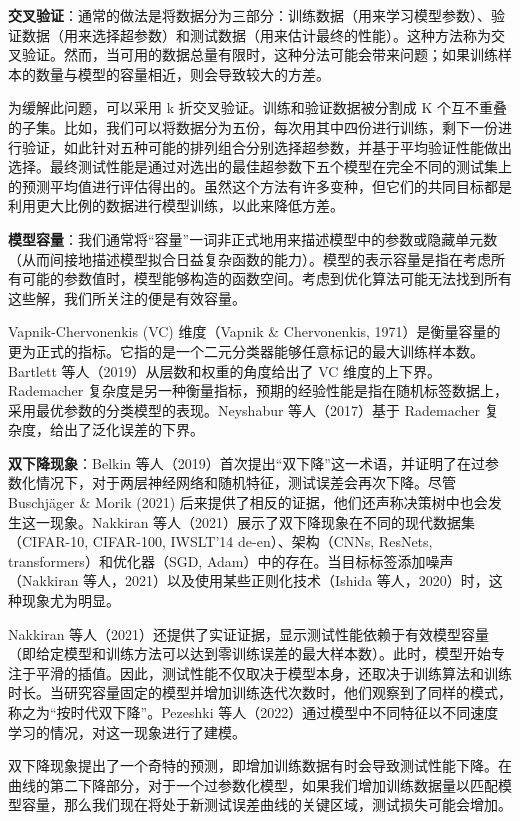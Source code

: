 \documentclass[lang=cn,newtx,10pt,scheme=chinese]{elegantbook}
\begin{document}
\textbf{交叉验证}：通常的做法是将数据分为三部分：训练数据（用来学习模型参数）、验证数据（用来选择超参数）和测试数据（用来估计最终的性能）。这种方法称为交叉验证。然而，当可用的数据总量有限时，这种分法可能会带来问题；如果训练样本的数量与模型的容量相近，则会导致较大的方差。

为缓解此问题，可以采用 k 折交叉验证。训练和验证数据被分割成 K 个互不重叠的子集。比如，我们可以将数据分为五份，每次用其中四份进行训练，剩下一份进行验证，如此针对五种可能的排列组合分别选择超参数，并基于平均验证性能做出选择。最终测试性能是通过对选出的最佳超参数下五个模型在完全不同的测试集上的预测平均值进行评估得出的。虽然这个方法有许多变种，但它们的共同目标都是利用更大比例的数据进行模型训练，以此来降低方差。

\textbf{模型容量}：我们通常将“容量”一词非正式地用来描述模型中的参数或隐藏单元数（从而间接地描述模型拟合日益复杂函数的能力）。模型的表示容量是指在考虑所有可能的参数值时，模型能够构造的函数空间。考虑到优化算法可能无法找到所有这些解，我们所关注的便是有效容量。

Vapnik-Chervonenkis (VC) 维度（Vapnik \& Chervonenkis, 1971）是衡量容量的更为正式的指标。它指的是一个二元分类器能够任意标记的最大训练样本数。Bartlett 等人（2019）从层数和权重的角度给出了 VC 维度的上下界。Rademacher 复杂度是另一种衡量指标，预期的经验性能是指在随机标签数据上，采用最优参数的分类模型的表现。Neyshabur 等人（2017）基于 Rademacher 复杂度，给出了泛化误差的下界。

\textbf{双下降现象}：Belkin 等人（2019）首次提出“双下降”这一术语，并证明了在过参数化情况下，对于两层神经网络和随机特征，测试误差会再次下降。尽管 Buschjäger \& Morik (2021) 后来提供了相反的证据，他们还声称决策树中也会发生这一现象。Nakkiran 等人（2021）展示了双下降现象在不同的现代数据集（CIFAR-10, CIFAR-100, IWSLT’14 de-en）、架构（CNNs, ResNets, transformers）和优化器（SGD, Adam）中的存在。当目标标签添加噪声（Nakkiran 等人，2021）以及使用某些正则化技术（Ishida 等人，2020）时，这种现象尤为明显。

Nakkiran 等人（2021）还提供了实证证据，显示测试性能依赖于有效模型容量（即给定模型和训练方法可以达到零训练误差的最大样本数）。此时，模型开始专注于平滑的插值。因此，测试性能不仅取决于模型本身，还取决于训练算法和训练时长。当研究容量固定的模型并增加训练迭代次数时，他们观察到了同样的模式，称之为“按时代双下降”。Pezeshki 等人（2022）通过模型中不同特征以不同速度学习的情况，对这一现象进行了建模。

双下降现象提出了一个奇特的预测，即增加训练数据有时会导致测试性能下降。在曲线的第二下降部分，对于一个过参数化模型，如果我们增加训练数据量以匹配模型容量，那么我们现在将处于新测试误差曲线的关键区域，测试损失可能会增加。
\end{document}
